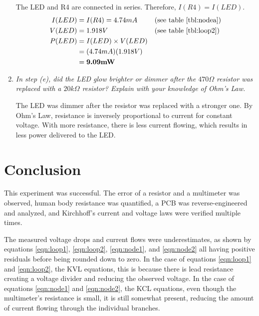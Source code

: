 \documentclass[12pt]{article}
\begin{document}
\begin{enumerate}
{        The LED and R4 are connected in series. Therefore, $I(R4) = I(LED)$.
        \begin{equation}
            \begin{aligned}
                I(LED) &= I(R4) = 4.74mA && \textnormal{(see table \ref{tbl:nodea})} \\
                V(LED) &= 1.918V && \textnormal{(see table \ref{tbl:loop2})} \\
                P(LED) &= I(LED) \times V(LED) \\ 
                &= (4.74mA)(1.918V) \\ 
                &= \textbf{9.09mW}
            \end{aligned}
        \end{equation}

    }
    \item {
        \textit{In step (e), did the LED glow brighter or dimmer after the $470\Omega$ resistor was replaced 
        with a $20k\Omega$ resistor? Explain with your knowledge of Ohm's Law.}
        
        The LED was dimmer after the resistor was replaced with a stronger one. By Ohm's Law, resistance is inversely proportional
        to current for constant voltage. With more resistance, there is less current flowing, which results in 
        less power delivered to the LED.
    }
\end{enumerate}

\section*{Conclusion}

This experiment was successful. The error of a resistor and a multimeter was observed, human body resistance 
was quantified, a PCB was reverse-engineered and analyzed, and Kirchhoff's current and voltage laws were verified 
multiple times.

The measured voltage drops and current flows were underestimates, as shown by equations \ref{eqn:loop1}, 
\ref{eqn:loop2}, \ref{eqn:node1}, and \ref{eqn:node2} all having positive residuals before being rounded down 
to zero. In the case of equations \ref{eqn:loop1} and \ref{eqn:loop2}, the KVL equations, this is because there is 
lead resistance creating a voltage divider and reducing the observed voltage. In the case of equations \ref{eqn:node1}
and \ref{eqn:node2}, the KCL equations, even though the multimeter's resistance is small, it is still
somewhat present, reducing the amount of current flowing through the individual branches. 
\end{document}
